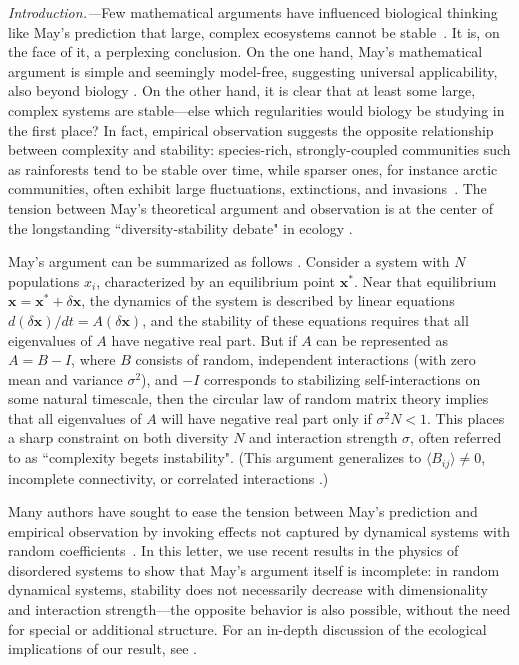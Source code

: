 \emph{Introduction.---}Few mathematical arguments have influenced biological thinking like May's prediction that large, complex ecosystems cannot be stable~\cite{May1972}.
It is, on the face of it, a perplexing conclusion.
On the one hand, May's mathematical argument is simple and seemingly model-free, suggesting universal applicability, also beyond biology \cite{Haldane2011, Moran2019}.
On the other hand, it is clear that at least some large, complex systems are stable---else which regularities would biology be studying in the first place? 
In fact, empirical observation suggests the opposite relationship between complexity and stability: species-rich, strongly-coupled communities such as rainforests tend to be stable over time, while sparser ones, for instance arctic communities, often exhibit large fluctuations, extinctions, and invasions~\cite{Hutchinson1959,Odum1959,MacArthur1955}. 
The tension between May's theoretical argument and observation is at the center of the longstanding ``diversity-stability debate" in ecology \cite{McCann2000, Loreau2022}.

May's argument can be summarized as follows \cite{May1972}.
Consider a system with $N$ populations $x_i$, characterized by an equilibrium point $\mathbf x^*$.
Near that equilibrium $\mathbf x = \mathbf x^* + \delta \mathbf x$, the dynamics of the system is described by linear equations $d(\delta \mathbf x)/dt = A (\delta \mathbf x)$, and the stability of these equations requires that all eigenvalues of $A$ have negative real part.
But if $A$ can be represented as $A = B - I$, where $B$ consists of random, independent interactions (with zero 
mean and variance $\sigma^2$), and $-I$ corresponds to stabilizing self-interactions on some natural timescale, 
then the circular law of random matrix theory implies that all eigenvalues of $A$ will have negative real part only if $\sigma^2 N < 1$.
This places a sharp constraint on both diversity $N$ and interaction strength $\sigma$, often referred to as ``complexity begets instability".
(This argument generalizes to $\langle B_{ij}\rangle \neq 0$, incomplete connectivity, or correlated interactions \cite{allesina2015stability}.)

Many authors have sought to ease the tension between May's prediction and empirical observation by invoking effects not captured by dynamical systems with random coefficients~\cite{McCann2000,Chesson2000,Mougi2012,Rohr2014,Barabas2017,Grilli2017}. 
In this letter, we use recent results in the physics of disordered systems \cite{Ahmadian2015, Roy2019} to show that May's argument itself is incomplete: in random dynamical systems, stability does not necessarily decrease with dimensionality and interaction strength---the opposite behavior is also possible, without the need for special or additional structure.
For an in-depth discussion of the ecological implications of our result, see \cite{Hatton2023}.